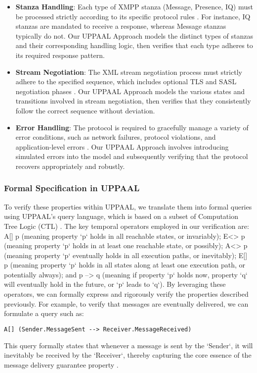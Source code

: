 \begin{itemize}
    \item \textbf{Stanza Handling}: Each type of XMPP stanza (Message, Presence, IQ) must be processed strictly according to its specific protocol rules \cite{rfc6120}. For instance, IQ stanzas are mandated to receive a response, whereas Message stanzas typically do not. Our UPPAAL Approach models the distinct types of stanzas and their corresponding handling logic, then verifies that each type adheres to its required response pattern.
    \item \textbf{Stream Negotiation}: The XML stream negotiation process must strictly adhere to the specified sequence, which includes optional TLS and SASL negotiation phases \cite{meijer2005jabber}. Our UPPAAL Approach models the various states and transitions involved in stream negotiation, then verifies that they consistently follow the correct sequence without deviation.
    \item \textbf{Error Handling}: The protocol is required to gracefully manage a variety of error conditions, such as network failures, protocol violations, and application-level errors \cite{waher2015learning}. Our UPPAAL Approach involves introducing simulated errors into the model and subsequently verifying that the protocol recovers appropriately and robustly.
\end{itemize}

\subsubsection{Formal Specification in UPPAAL}
To verify these properties within UPPAAL, we translate them into formal queries using UPPAAL's query language, which is based on a subset of Computation Tree Logic (CTL) \cite{larsen1997uppaal}. The key temporal operators employed in our verification are: A[] p (meaning property `p` holds in all reachable states, or invariably); E<> p (meaning property `p` holds in at least one reachable state, or possibly); A<> p (meaning property `p` eventually holds in all execution paths, or inevitably); E[] p (meaning property `p` holds in all states along at least one execution path, or potentially always); and p --> q (meaning if property `p` holds now, property `q` will eventually hold in the future, or `p` leads to `q`). By leveraging these operators, we can formally express and rigorously verify the properties described previously. For example, to verify that messages are eventually delivered, we can formulate a query such as:
\begin{verbatim}
A[] (Sender.MessageSent --> Receiver.MessageReceived)
\end{verbatim}
This query formally states that whenever a message is sent by the `Sender`, it will inevitably be received by the `Receiver`, thereby capturing the core essence of the message delivery guarantee property \cite{larsen1997uppaal,meijer2005jabber}.

